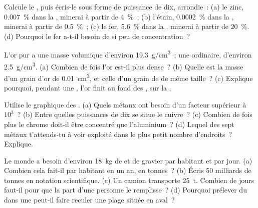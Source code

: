 \begin{exercise}[$\star\star$]\label{exo:g9:earth-resources:5}
Calcule le , puis écris-le sous forme de puissance
de dix, arrondie~: (a) le zinc, \qty{0.007}{\%} dans la , minerai à
partir de \qty{4}{\%}~; (b) l'étain, \qty{0.0002}{\%} dans la ,
minerai à partir de \qty{0.5}{\%}~; (c) le fer, \qty{5.6}{\%} dans la
, minerai à partir de \qty{20}{\%}. (d) Pourquoi le fer a-t-il
besoin de si peu de concentration~?
\end{exercise}

\begin{exercise}[$\star\star$]\label{exo:g9:earth-resources:6}
L'or pur a une masse volumique d'environ \qty{19.3}{g/cm^3}~; une 
ordinaire, d'environ \qty{2.5}{g/cm^3}. (a) Combien de fois l'or est-il
plus dense~? (b) Quelle est la masse d'un grain d'or de \qty{0.01}{cm^3},
et celle d'un grain de  de même taille~? (c) Explique pourquoi,
pendant une , l'or finit au fond des , sur la .
\end{exercise}

\begin{exercise}[$\star\star$]\label{exo:g9:earth-resources:7}
Utilise le graphique des . (a) Quels métaux ont
besoin d'un facteur supérieur à $10^3$~? (b) Entre quelles puissances de
dix se situe le cuivre~? (c) Combien de fois plus le chrome doit-il être
concentré que l'aluminium~? (d) Lequel des sept métaux t'attends-tu à voir
exploité dans le plus petit nombre d'endroits~? Explique.
\end{exercise}

\begin{exercise}[$\star\star$]\label{exo:g9:earth-resources:8}
Le monde a besoin d'environ \qty{18}{kg} de  et de gravier par
habitant et par jour. (a) Combien cela fait-il par habitant en un an, en
tonnes~? (b) Écris 50 milliards de tonnes en notation scientifique. (c) Un
camion transporte \qty{25}{t}. Combien de jours faut-il pour que la part
d'une personne le remplisse~? (d) Pourquoi prélever du  dans une
 peut-il faire reculer une plage située en aval~?
\end{exercise}

